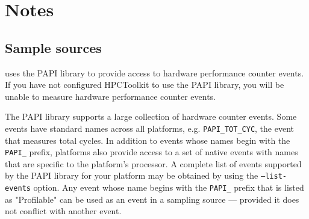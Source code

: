 \documentclass[english]{article}
\begin{document}
\section{Notes}

\subsection{Sample sources}

 uses the PAPI library to provide access to hardware performance counter events.
If you have not configured HPCToolkit to use the PAPI library, you will be unable to measure hardware performance counter events.

The PAPI library supports a large collection of hardware counter events.
Some events have standard names across all platforms, e.g. \verb+PAPI_TOT_CYC+, the event that measures total cycles.
In addition to events whose names begin with the \verb+PAPI_+ prefix, platforms also provide access to a set of native events with names that are specific to the platform's processor.
A complete list of events supported by the PAPI library for your platform may be obtained by using the \texttt{--list-events} option.
Any event whose name begins with the \verb+PAPI_+ prefix that is listed as "Profilable" can be used as an event in a sampling source --- provided it does not conflict with another event.
\end{document}
